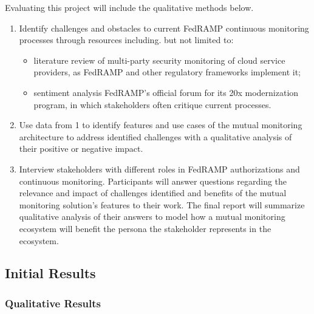 Evaluating this project will include the qualitative methods below.

\begin{enumerate}
  \item Identify challenges and obstacles to current FedRAMP continuous monitoring processes through resources including. but not limited to:
  \begin{itemize}
    \item literature review of multi-party security monitoring of cloud service providers, as FedRAMP and other regulatory frameworks implement it;
    \item sentiment analysis FedRAMP's official forum for its 20x modernization program, in which stakeholders often critique current processes.
  \end{itemize}
  \item Use data from 1 to identify features and use cases of the mutual monitoring architecture to address identified challenges with a qualitative analysis of their positive or negative impact.
  \item Interview stakeholders with different roles in FedRAMP authorizations and continuous monitoring. Participants will answer questions regarding the relevance and impact of challenges identified and benefits of the mutual monitoring solution's features to their work. The final report will summarize qualitative analysis of their answers to model how a mutual monitoring ecosystem will benefit the persona the stakeholder represents in the ecosystem.
\end{enumerate}


\subsection*{Initial Results}

\subsubsection*{Qualitative Results}

